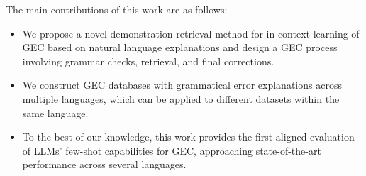 The main contributions of this work are as follows:
\begin{itemize}
    \item We propose a novel demonstration retrieval method for in-context learning of GEC based on natural language explanations and design a GEC process involving grammar checks, retrieval, and final corrections.
    \item We construct GEC databases with grammatical error explanations across multiple languages, which can be applied to different datasets within the same language.
    \item To the best of our knowledge, this work provides the first aligned evaluation of LLMs' few-shot capabilities for GEC, approaching state-of-the-art performance across several languages.
\end{itemize}
